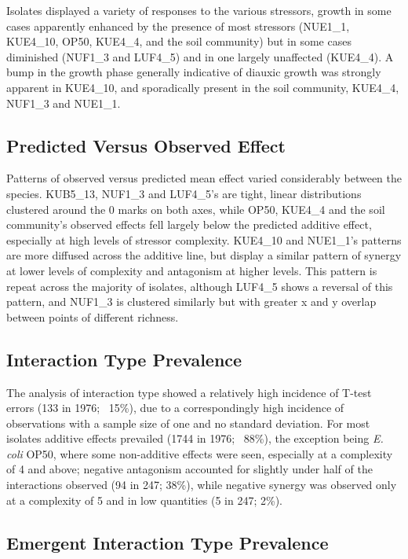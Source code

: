 \documentclass[final,1p,times]{elsarticle}
\begin{document}
Isolates displayed a variety of responses to the various stressors, growth in some cases apparently enhanced by the presence of most stressors (NUE1\_1, KUE4\_10, OP50, KUE4\_4, and the soil community) but in some cases diminished (NUF1\_3 and LUF4\_5) and in one largely unaffected (KUE4\_4). A bump in  the growth phase generally indicative of diauxic growth was strongly apparent in KUE4\_10, and sporadically present in the soil community, KUE4\_4, NUF1\_3 and NUE1\_1. 

\subsection{Predicted Versus Observed Effect}
\label{S:3:4}

Patterns of observed versus predicted mean effect varied considerably between the species. KUB5\_13, NUF1\_3 and LUF4\_5’s are tight, linear distributions clustered around the 0 marks on both axes, while OP50, KUE4\_4 and the soil community’s observed effects fell largely below the predicted additive effect, especially at high levels of stressor complexity. KUE4\_10 and NUE1\_1’s patterns are more diffused across the additive line, but display a similar pattern of synergy at lower levels of complexity and antagonism at higher levels. This pattern is repeat across the majority of isolates, although LUF4\_5 shows a reversal of this pattern, and NUF1\_3 is clustered similarly but with greater x and y overlap between points of different richness.

\subsection{Interaction Type Prevalence}
\label{S:3:5}

The analysis of interaction type showed a relatively high incidence of T-test errors (133 in 1976; ~15\%), due to a correspondingly high incidence of observations with a sample size of one and no standard deviation. For most isolates additive effects prevailed (1744 in 1976; ~88\%), the exception being \textit{E. coli} OP50, where some non-additive effects were seen, especially at a complexity of 4 and above; negative antagonism accounted for slightly under half of the interactions observed (94 in 247; 38\%), while negative synergy was observed only at a complexity of 5 and in low quantities (5 in 247; 2\%).

\subsection{Emergent Interaction Type Prevalence}
\label{S:3:6}
\end{document}
